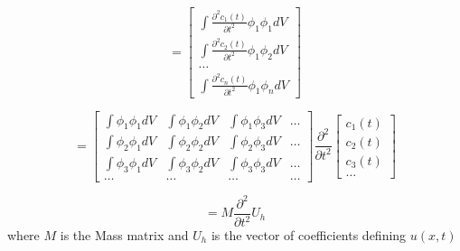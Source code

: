 $$= \begin{bmatrix}
\int \frac{\partial^2 c_1(t)}{\partial t^2} \phi_1 \phi_1 dV \\
\int \frac{\partial^2 c_2(t)}{\partial t^2} \phi_1 \phi_2 dV \\
\ldots \\
\int \frac{\partial^2 c_n(t)}{\partial t^2} \phi_1 \phi_n dV
\end{bmatrix}$$

$$= \begin{bmatrix}
    \int \phi_1 \phi_1 dV & \int \phi_1 \phi_2 dV & \int \phi_1 \phi_3 dV & \ldots \\
    \int \phi_2 \phi_1 dV & \int \phi_2 \phi_2 dV & \int \phi_2 \phi_3 dV & \ldots \\
    \int \phi_3 \phi_1 dV & \int \phi_3 \phi_2 dV & \int \phi_3 \phi_3 dV & \ldots \\
    \ldots & \ldots & \ldots & \ldots 
\end{bmatrix} 
\frac{\partial^2}{\partial t^2} 
\begin{bmatrix}
    c_1(t) \\
    c_2(t) \\
    c_3(t) \\
    \ldots
\end{bmatrix} $$

$$= M \frac{\partial^2}{\partial t^2} U_h$$
where $M$ is the Mass matrix and $U_h$ is the vector of coefficients defining $u(x,t)$


